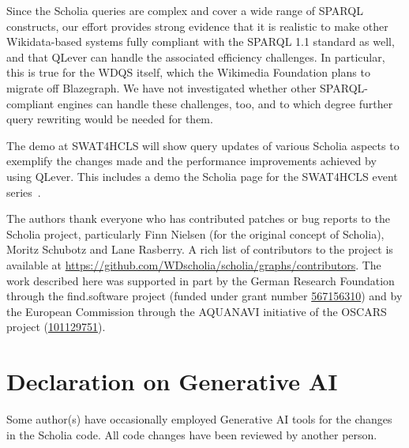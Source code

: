 \documentclass{ceurart}
\begin{document}
Since the Scholia queries are complex and cover a wide range of SPARQL constructs, our effort provides strong evidence that it is realistic to make other Wikidata-based systems fully compliant with the SPARQL 1.1 standard as well, and that QLever can handle the associated efficiency challenges. In particular, this is true for the WDQS itself, which the Wikimedia Foundation plans to migrate off Blazegraph. We have not investigated whether other SPARQL-compliant engines can handle these challenges, too, and to which degree further query rewriting would be needed for them.
\medskip
    
The demo at SWAT4HCLS will show query updates of various Scholia aspects to exemplify the changes made and the performance improvements achieved by using QLever. This includes a demo the Scholia page for the SWAT4HCLS event series~\cite{ScholiaSWAT4HCLS}.

\begin{acknowledgments}
  The authors thank everyone who has contributed patches or bug reports to the Scholia project, particularly
  Finn Nielsen (for the original concept of Scholia), Moritz Schubotz and Lane Rasberry.
  A rich list of contributors to the project is available at \url{https://github.com/WDscholia/scholia/graphs/contributors}. The work described here was supported in part by the German Research Foundation through the find.software project \cite{gey2025find.software} (funded under grant number \href{https://gepris.dfg.de/gepris/projekt/567156310}{567156310}) and by the European Commission through the AQUANAVI initiative \cite{heger2025aquanavi} of the OSCARS project (\href{https://cordis.europa.eu/project/id/101129751}{101129751}).
\end{acknowledgments}

\section*{Declaration on Generative AI}
Some author(s) have occasionally employed Generative AI tools for the changes in the Scholia code. All code changes have been reviewed by another person.


\end{document}
